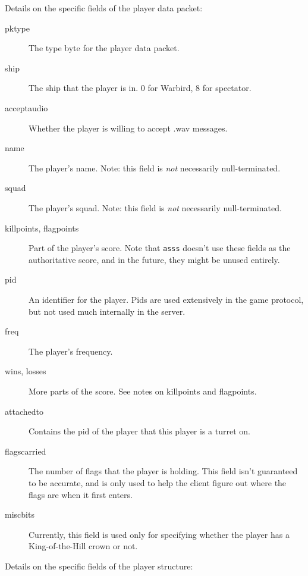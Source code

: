\documentclass{article}
\newcommand{\asss}{\texttt{asss}}
\begin{document}
Details on the specific fields of the player data packet:

\begin{description}

\item[pktype] The type byte for the player data packet.

\item[ship] The ship that the player is in. 0 for Warbird, 8 for
spectator.

\item[acceptaudio] Whether the player is willing to accept .wav
messages.

\item[name] The player's name. Note: this field is \emph{not}
necessarily null-terminated.

\item[squad] The player's squad. Note: this field is \emph{not}
necessarily null-terminated.

\item[killpoints, flagpoints] Part of the player's score. Note that
\asss{} doesn't use these fields as the authoritative score, and in the
future, they might be unused entirely.

\item[pid] An identifier for the player. Pids are used extensively in
the game protocol, but not used much internally in the server.

\item[freq] The player's frequency.

\item[wins, losses] More parts of the score. See notes on killpoints and
flagpoints.

\item[attachedto] Contains the pid of the player that this player is a
turret on.

\item[flagscarried] The number of flags that the player is holding. This
field isn't guaranteed to be accurate, and is only used to help the
client figure out where the flags are when it first enters.

\item[miscbits] Currently, this field is used only for specifying
whether the player has a King-of-the-Hill crown or not.

\end{description}

Details on the specific fields of the player structure:
\end{document}
